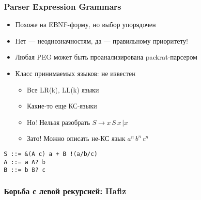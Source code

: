 \documentclass{beamer}
\begin{document}
\begin{frame}[fragile]
  \transwipe[direction=90]
  \frametitle{Parser Expression Grammars}
\begin{itemize}
  \item Похоже на EBNF-форму, но выбор упорядочен
  \item Нет --- неоднозначностям, да --- правильному приоритету!
\end{itemize}

\begin{itemize}
  \item Любая PEG может быть проанализирована packrat-парсером
\end{itemize}

\begin{itemize}
  \item Класс принимаемых языков: не известен
  \begin{itemize}
    \item Все LR(k), LL(k) языки
    \item Какие-то еще КС-языки
    \item Но! Нельзя разобрать $S \rightarrow x \, S \, x \, | x$
    \item Зато! Можно описать не-КС язык ${a^n \, b^n \, c^n}$
  \end{itemize}
\end{itemize}

\begin{verbatim}
S ::= &(A c) a + B !(a/b/c)
A ::= a A? b
B ::= b B? c
\end{verbatim}

\end{frame}

\begin{frame}[fragile]
  \transwipe[direction=90]
  \frametitle{Борьба с левой рекурсией: Hafiz}

\end{frame}

\begin{frame}[fragile]
  \transwipe[direction=90]
  \frametitle{}

\end{frame}

\begin{frame}[fragile]
  \transwipe[direction=90]
  \frametitle{}

\end{frame}

\begin{frame}[fragile]
  \transwipe[direction=90]
  \frametitle{}

\end{frame}
\end{document}
